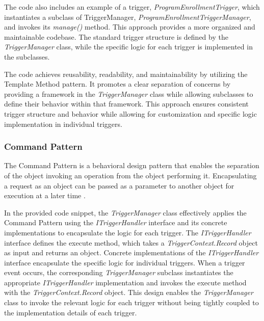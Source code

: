 \documentclass[12pt]{article}
\begin{document}
The code also includes an example of a trigger, \textit{ProgramEnrollmentTrigger}, which instantiates a subclass of TriggerManager, \textit{ProgramEnrollmentTriggerManager}, and invokes its \textit{manage()} method. This approach provides a more organized and maintainable codebase. The standard trigger structure is defined by the \textit{TriggerManager} class, while the specific logic for each trigger is implemented in the subclasses.

The code achieves reusability, readability, and maintainability by utilizing the Template Method pattern. It promotes a clear separation of concerns by providing a framework in the \textit{TriggerManager} class while allowing subclasses to define their behavior within that framework. This approach ensures consistent trigger structure and behavior while allowing for customization and specific logic implementation in individual triggers.

\subsubsection{Command Pattern}
The Command Pattern is a behavioral design pattern that enables the separation of the object invoking an operation from the object performing it. Encapsulating a request as an object can be passed as a parameter to another object for execution at a later time \cite{b1}. 

In the provided code snippet, the \textit{TriggerManager} class effectively applies the Command Pattern using the \textit{ITriggerHandler} interface and its concrete implementations to encapsulate the logic for each trigger. The \textit{ITriggerHandler} interface defines the execute method, which takes a \textit{TriggerContext.Record} object as input and returns an object. Concrete implementations of the \textit{ITriggerHandler} interface encapsulate the specific logic for individual triggers. When a trigger event occurs, the corresponding \textit{TriggerManager} subclass instantiates the appropriate \textit{ITriggerHandler} implementation and invokes the execute method with the \textit{TriggerContext.Record} object. This design enables the \textit{TriggerManager} class to invoke the relevant logic for each trigger without being tightly coupled to the implementation details of each trigger.
\end{document}
